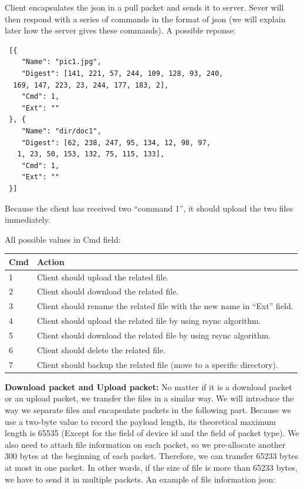 \documentclass{article}
\begin{document}
 Client encapsulates the json in a pull packet and sends it to server. Sever will then respond with a series of commands in the format of json (we will explain later how the server gives these commands).
 \newline
 \hfill \break
A possible reponse:

 \begin{lstlisting}
 [{
 	"Name": "pic1.jpg",
 	"Digest": [141, 221, 57, 244, 109, 128, 93, 240,
  169, 147, 223, 23, 244, 177, 183, 2],
 	"Cmd": 1,
 	"Ext": ""
 }, {
 	"Name": "dir/doc1",
 	"Digest": [62, 238, 247, 95, 134, 12, 98, 97,
   1, 23, 50, 153, 132, 75, 115, 133],
 	"Cmd": 1,
 	"Ext": ""
 }]
 \end{lstlisting}

Because the client has received two “command 1”, it should upload the two files immediately.
\newline
\hfill \break

All possible values in Cmd field:
 \begin{center}
 \begin{tabular}{ | m{1.4cm}| m{10cm} | }
 \hline
 \textbf{Cmd} & \textbf{Action}  \\
 \hline
  1 & Client should upload the related file.  \\
 \hline
 2 & Client should download the related file.  \\
 \hline
 3 & Client should rename the related file with the new name in “Ext” field. \\
 \hline
 4 & Client should upload the related file by using rsync algorithm. \\
 \hline
 5 & Client should download the related file by using rsync algorithm. \\
 \hline
 6 & Client should delete the related file. \\
 \hline
 7 & Client should backup the related file (move to a specific directory). \\
 \hline
 \end{tabular}
 \end{center}

 \textbf{Download packet and Upload packet:} No matter if it is a download packet or an upload packet, we transfer the files in a similar way. We will introduce the way we separate files and encapsulate packets in the following part.
 \newline
 \hfill \break
Because we use a two-byte value to record the payload length, its theoretical maximum length is 65535 (Except for the field of device id and the field of packet type). We also need to attach file information on each packet, so we pre-allocate another 300 bytes at the beginning of each packet. Therefore, we can transfer 65233 bytes at most in one packet. In other words, if the size of file is more than 65233 bytes, we have to send it in multiple packets.
\newline
\hfill \break
An example of file information json:
\end{document}
